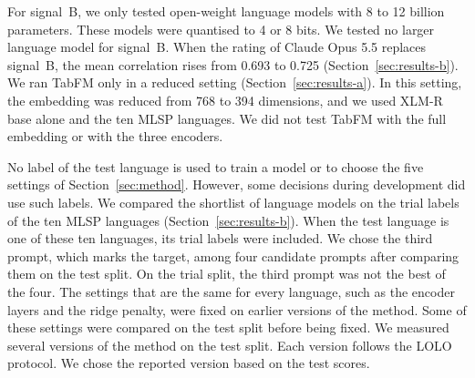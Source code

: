 For signal~B, we only tested open-weight language models with 8 to 12 billion parameters. These %
models were quantised to 4 or 8 bits. We tested no larger language model for signal~B. When the %
rating of Claude Opus 5.5 replaces signal~B, the mean correlation rises from 0.693 to 0.725 %
(Section~\ref{sec:results-b}). We ran TabFM only in a reduced setting (Section~\ref{sec:results-a}).
In this setting, the embedding was reduced from 768 to 394 dimensions, and we used XLM-R base alone %
and the ten MLSP languages. We did not test TabFM with the full embedding or with the three encoders.

No label of the test language is used to train a model or to choose the five settings of %
Section~\ref{sec:method}. However, some decisions during development did use such labels. We
compared the shortlist of language models on the trial labels of the ten MLSP languages %
(Section~\ref{sec:results-b}). When the test language is one of these ten languages, its trial %
labels were included. We chose the third prompt, which marks the target, among four candidate %
prompts after comparing them on the test split. On the trial split, the third prompt was not the %
best of the four. The settings that are the same for every language, such as the encoder layers
and the ridge penalty, were fixed on earlier versions of the method. Some of these settings were %
compared on the test split before being fixed. We measured several versions of the method on the %
test split. Each version follows the LOLO protocol. We chose the reported version based on the
test scores.

